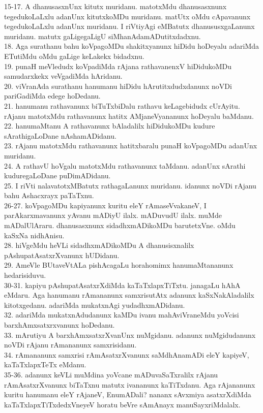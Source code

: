 \documentclass{article}
\begin{document}
15-17. A dhanusasxnUnx kitutx muridanu. matotxMdu dhanusasxnunx tegedukoLaLxlu adanUnx kitutxkoMDu muridanu. matUtx oMdu cApavanunx tegedukoLaLxlu adanUnx muridanu. I riVtiyAgi eMBatutx dhanususxgaLanunx muridanu. matutx gaLigegaLigU siMhanAdamADutitxdadxnu.\\
18. Aga surathanu bahu koVpagoMDu shakitxyanunx hiDidu hoDeyalu adariMda ETutiMdu oMdu gaLige keLakekx bidadxnu.\\
19. punaH meVledudx koVpadiMda rAjana rathavanenxV hiDidukoMDu samudarxkekx veVgadiMda hAridanu.\\
20. viVranAda surathanu hanumanu hiDidu hArutitxdudxdanunx noVDi pariGadiMda edege hoDedanu.\\
21. hanumanu rathavanunx biTuTxbiDalu rathavu keLagebidudx cUrAyitu. rAjanu matotxMdu rathavanunx hatitx AMjaneVyananunx hoDeyalu baMdanu.\\
22. hanumaMtanu A rathavanunx bAladalilx hiDidukoMDu kudure sArathigaLoDane nAshamADidanu.\\
23. rAjanu matotxMdu rathavanunx hatitxbaralu punaH koVpagoMDu adanUnx muridanu.\\
24. A rathavU hoVgalu matotxMdu rathavanunx taMdanu. adanUnx sArathi kuduregaLoDane puDimADidanu.\\
25. I riVti nalavatotxMBatutx rathagaLanunx muridanu. idanunx noVDi rAjanu bahu Ashacxrayx paTaTxnu.\\
26-27. koVpagoMDu kapiyanunx kuritu eleY rAmaseVvakaneV, I parAkarxmavanunx yAvanu mADiyU ilalx. mADuvudU ilalx. muMde mADalUlAraru. dhanusasxnunx sidadhxmADikoMDu barutetxVne. oMdu kaSxNa nidhAnisu.\\
28. hiVgeMdu heVLi sidadhxmADikoMDu A dhanusisxnalilx pAshupatAsatxrXvanunx hUDidanu.\\
29. AmeVle BUtaveVtALa pishAcagaLu horahomimx hanumaMtananunx hedarisiduvu.\\
30-31. kapiyu pAshupatAsatxrXdiMda kaTaTxlapxTiTxtu. janagaLu hAhA eMdaru. Aga hanumanu rAmananunx samxrisutAtx adanunx kaSxNakAladalilx kitotxgedanu. adariMda mukatxnAgi yudadhxmADidanu.\\
32. adariMda mukatxnAdudanunx kaMDu ivanu mahAviVraneMdu yoVcisi barxhAmxsatxrxvanunx hoDedanu.\\
33. mArutiyu A barxhAmxsatxrXvanUnx nuMgidanu. adanunx nuMgidudanunx noVDi rAjanu rAmananunx samxrisidanu.\\
34. rAmananunx samxrisi rAmAsatxrXvanunx saMdhAnamADi eleY kapiyeV, kaTaTxlapxTeTx eMdanu.\\
35-36. adanunx keVLi muMdina yoVcane mADuvaSaTxralilx rAjanu rAmAsatxrXvanunx biTaTxnu matutx ivananunx kaTiTxdanu. Aga rAjananunx kuritu hanumanu eleY rAjaneV, EnumADali? nananx sAvxmiya asatxrXdiMda kaTaTxlapxTiTxdedxVneyeV horatu beVre sAmAnayx manuSayxriMdalalx.\\
\end{document}
